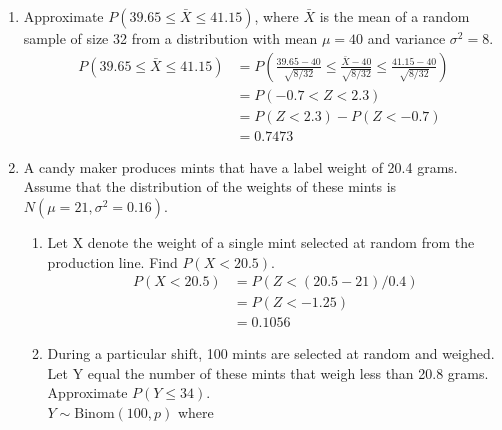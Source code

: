 \documentclass[12pt]{article} %
\newcommand{\Red}{\color{Red}}
\begin{document}
\begin{enumerate}
\begin{itemize}
\end{itemize}
Assume the stock options of these two companies are independent. The investor
buys 8 shares of Burger Queen stock option and 9 shares of Dairy King stock
option. What is the probability that the value of this portfolio will exceed \$300? \\ {\Red Let $X$ denote the share price of Burger Queen stock options and $Y$ denote the share price of Dairy King stock options. Then we have $X \sim N(18, 9)$ and $Y \sim N(14, 4)$. Therefore, we have $$\begin{aligned}
    P(8X+9Y > 300) &= P(N(270, 900) > 300) \\
    &= P(Z > 1) \\
    &= 1 - P(Z < 1)\\
    &= 0.1587
\end{aligned}$$}
\newpage
\item Approximate $P(39.65 \leq \bar{X} \leq 41.15)$, where $ \bar{X} $ is the mean of a random sample of size 32 from a distribution with mean $\mu=40$ and variance $\sigma^2=8$. \\ {\Red $$\begin{aligned}
    P(39.65 \leq \bar{X} \leq 41.15) &= P\left( \frac{39.65-40}{\sqrt{8/32}} \leq \frac{\bar{X}-40}{\sqrt{8/32}} \leq \frac{41.15-40}{\sqrt{8/32}} \right) \\
    &= P(-0.7 < Z < 2.3) \\
    &= P(Z < 2.3) - P(Z < -0.7) \\
    &= 0.7473
\end{aligned}$$}
\newpage
\item A candy maker produces mints that have a label weight of 20.4 grams. Assume that the distribution of the weights of these mints is $N(\mu=21,\sigma^2=0.16)$.
	\begin{enumerate}
		\item Let X denote the weight of a single mint selected at random from the production line. Find $P(X < 20.5)$. \\ {\Red $$\begin{aligned}
		    P(X < 20.5) &= P(Z < (20.5-21)/0.4) \\
            &= P(Z < -1.25) \\
            &= 0.1056
		\end{aligned}$$}
		\item During a particular shift, 100 mints are selected at random and weighed. Let Y equal the number of these mints that weigh less than 20.8 grams. Approximate $P(Y \leq 34)$. \\ {\Red $Y \sim \text{Binom}(100, p)$ where $$\begin{aligned}

\end{aligned}$$}
\end{enumerate}
\end{enumerate}
\end{document}
